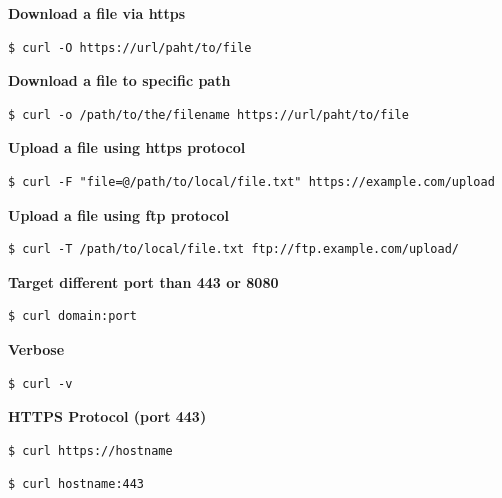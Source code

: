 \documentclass{article}
\newenvironment{codetemplate}[1][]{%
  \mybasecolorbox[#1]
  \itshape
}{%
  \endmybasecolorbox
}
\begin{document}
\textbf{Download a file via https}
\begin{codetemplate}{}
\begin{verbatim}
$ curl -O https://url/paht/to/file
\end{verbatim}
\end{codetemplate}

\textbf{Download a file to specific path}
\begin{codetemplate}{}
\begin{verbatim}
$ curl -o /path/to/the/filename https://url/paht/to/file
\end{verbatim}
\end{codetemplate}

\textbf{Upload a file using https protocol}
\begin{codetemplate}{}
\begin{verbatim}
$ curl -F "file=@/path/to/local/file.txt" https://example.com/upload
\end{verbatim}
\end{codetemplate}

\textbf{Upload a file using ftp protocol}
\begin{codetemplate}{}
\begin{verbatim}
$ curl -T /path/to/local/file.txt ftp://ftp.example.com/upload/
\end{verbatim}
\end{codetemplate}

\textbf{Target different port than 443 or 8080}
\begin{codetemplate}{}
\begin{verbatim}
$ curl domain:port
\end{verbatim}
\end{codetemplate}

\textbf{Verbose}
\begin{codetemplate}{}
\begin{verbatim}
$ curl -v 
\end{verbatim}
\end{codetemplate}

\textbf{HTTPS Protocol (port 443)}
\begin{codetemplate}{}
\begin{verbatim}
$ curl https://hostname
\end{verbatim}
\end{codetemplate}
\begin{codetemplate}{}
\begin{verbatim}
$ curl hostname:443
\end{verbatim}
\end{codetemplate}
\end{document}
